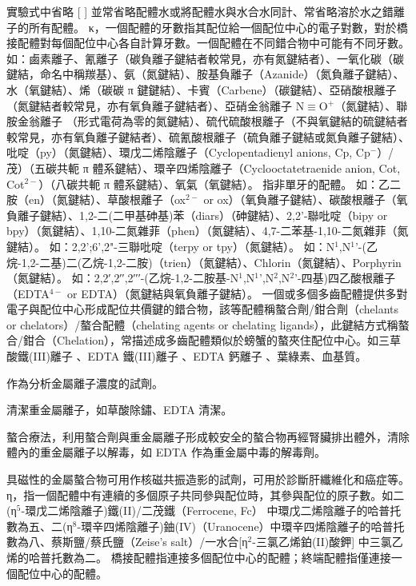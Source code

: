 \documentclass[a4paper,12pt]{report}
\begin{document}
實驗式中省略 [ ] 並常省略配體水或將配體水與水合水同計、常省略溶於水之錯離子的所有配體。
κ，一個配體的牙數指其配位給一個配位中心的電子對數，對於橋接配體對每個配位中心各自計算牙數。一個配體在不同錯合物中可能有不同牙數。
如：鹵素離子、氰離子（碳負離子鍵結者較常見，亦有氮鍵結者）、一氧化碳（碳鍵結，命名中稱羰基）、氨（氮鍵結）、胺基負離子（Azanide）（氮負離子鍵結）、水（氧鍵結）、烯（碳碳 π 鍵鍵結）、卡賓（Carbene）（碳鍵結）、亞硝酸根離子（氮鍵結者較常見，亦有氧負離子鍵結者）、亞硝金翁離子 N$\equiv$O$^+$（氮鍵結）、聯胺金翁離子 （形式電荷為零的氮鍵結）、硫代硫酸根離子（不與氧鍵結的硫鍵結者較常見，亦有氧負離子鍵結者）、硫氰酸根離子（硫負離子鍵結或氮負離子鍵結）、吡啶（py）（氮鍵結）、環戊二烯陰離子（Cyclopentadienyl anions, Cp, Cp$^-$）/茂）（五碳共軛 π 體系鍵結）、環辛四烯陰離子（Cyclooctatetraenide anion, Cot, Cot$^{2-}$）（八碳共軛 π 體系鍵結）、氧氣（氧鍵結）。
指非單牙的配體。
如：乙二胺（en）（氮鍵結）、草酸根離子（ox$^{2-}$ or ox）（氧負離子鍵結）、碳酸根離子（氧負離子鍵結）、1,2-二(二甲基砷基)苯（diars）（砷鍵結）、2,2'-聯吡啶（bipy or bpy）（氮鍵結）、1,10-二氮雜菲（phen）（氮鍵結）、4,7-二苯基-1,10-二氮雜菲（氮鍵結）。
如：2,2';6',2"-三聯吡啶（terpy or tpy）（氮鍵結）。
如：N$^1$,N$^1$'-(乙烷-1,2-二基)二(乙烷-1,2-二胺)（trien）（氮鍵結）、Chlorin（氮鍵結）、Porphyrin（氮鍵結）。
如：2,2′,2′′,2′′′-(乙烷-1,2-二胺基-N$^1$,N$^1$',N$^2$,N$^2$'-四基)四乙酸根離子（EDTA$^{4-}$ or EDTA）（氮鍵結與氧負離子鍵結）。
一個或多個多齒配體提供多對電子與配位中心形成配位共價鍵的錯合物，該等配體稱螯合劑/鉗合劑（chelants or chelators）/螯合配體（chelating agents or chelating ligands），此鍵結方式稱螯合/鉗合（Chelation），常描述成多齒配體類似於螃蟹的螯夾住配位中心。如三草酸鐵(III)離子 、EDTA 鐵(III)離子 \ce{[Fe(EDTA)]-}、EDTA 鈣離子 、葉綠素、血基質。
\bit
\item 作為分析金屬離子濃度的試劑。
\item 清潔重金屬離子，如草酸除鏽、EDTA 清潔。
\item 螯合療法，利用螯合劑與重金屬離子形成較安全的螯合物再經腎臟排出體外，清除體內的重金屬離子以解毒，如 EDTA 作為重金屬中毒的解毒劑。
\item 具磁性的金屬螯合物可用作核磁共振造影的試劑，可用於診斷肝纖維化和癌症等。
\eit
{}
η，指一個配體中有連續的多個原子共同參與配位時，其參與配位的原子數。如二(η$^5$-環戊二烯陰離子)鐵(II)/二茂鐵（Ferrocene, Fc）  中環戊二烯陰離子的哈普托數為五、二(η$^8$-環辛四烯陰離子)鈾(IV)（Uranocene）中環辛四烯陰離子的哈普托數為八、蔡斯鹽/蔡氏鹽（Zeise's salt）/一水合[η$^2$-三氯乙烯鉑(II)酸鉀]  中三氯乙烯的哈普托數為二。
橋接配體指連接多個配位中心的配體；終端配體指僅連接一個配位中心的配體。
\end{document}

